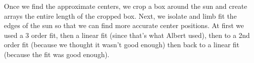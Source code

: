 \documentclass[10pt]{scrartcl}
\begin{document}
\begin{figure}[!ht]
\end{figure}

Once we find the approximate centers, we crop a box around the sun and create arrays the entire length of the cropped box. Next, we isolate and limb fit the edges of the sun so that we can find more accurate center positions. At first we used a 3 order fit, then a linear fit (since that's what Albert used), then to a 2nd order fit (because we thought it wasn't good enough) then back to a linear fit (because the fit was good enough). 
\end{document}
